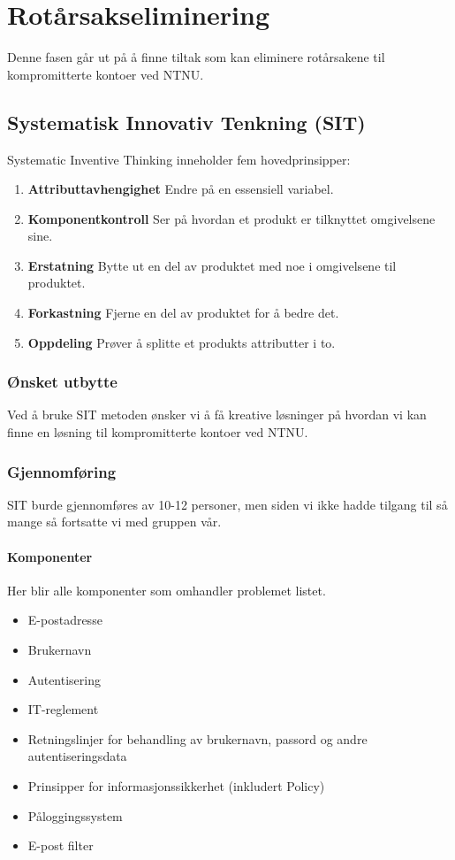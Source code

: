 \chapter{Rotårsakseliminering}
Denne fasen går ut på å finne tiltak som kan eliminere rotårsakene til kompromitterte kontoer ved NTNU. 

\section{Systematisk Innovativ Tenkning (SIT)}
Systematic Inventive Thinking inneholder fem hovedprinsipper:

\begin{enumerate}
    \item \textbf{Attributtavhengighet} Endre på en essensiell variabel.
    \item \textbf{Komponentkontroll} Ser på hvordan et produkt er tilknyttet omgivelsene sine.
    \item \textbf{Erstatning} Bytte ut en del av produktet med noe i omgivelsene til produktet.
    \item \textbf{Forkastning} Fjerne en del av produktet for å bedre det.
    \item \textbf{Oppdeling} Prøver å splitte et produkts attributter i to.
\end{enumerate}

\subsection{Ønsket utbytte}
Ved å bruke SIT metoden ønsker vi å få kreative løsninger på hvordan vi kan finne en løsning til kompromitterte kontoer ved NTNU. 

\subsection{Gjennomføring}
SIT burde gjennomføres av 10-12 personer, men siden vi ikke hadde tilgang til så mange så fortsatte vi med gruppen vår. 
\subsubsection{Komponenter} 
Her blir alle komponenter som omhandler problemet listet.

\begin{itemize}
    \item E-postadresse
    \item Brukernavn
    \item Autentisering
    \item IT-reglement
    \item Retningslinjer for behandling av brukernavn, passord og andre autentiseringsdata
    \item Prinsipper for informasjonssikkerhet (inkludert Policy)
    \item Påloggingssystem
    \item E-post filter
\end{itemize}

